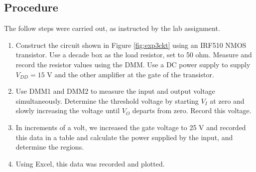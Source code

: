 \documentclass{report}
\begin{document}
\subsection{Procedure}
The follow steps were carried out, as instructed by the lab assignment.
\begin{enumerate}
	\item Construct the circuit shown in Figure \ref{fig:exp3ckt} using an IRF510 NMOS transistor. Use a decade box as the load resistor, set to 50 ohm. Measure and record the resistor values using the DMM. Use a DC power supply to supply $V_{DD} = 15$ V and the other amplifier at the gate of the transistor.
	\item Use DMM1 and DMM2 to measure the input and output voltage simultaneously. Determine the threshold voltage by starting $V_I$ at zero and slowly increasing the voltage until $V_O$ departs from zero. Record this voltage.
	\item In increments of a volt, we increased the gate voltage to 25 V and recorded this data in a table and calculate the power supplied by the input, and determine the regions.
	\item Using Excel, this data was recorded and plotted.
\end{enumerate}
\end{document}
